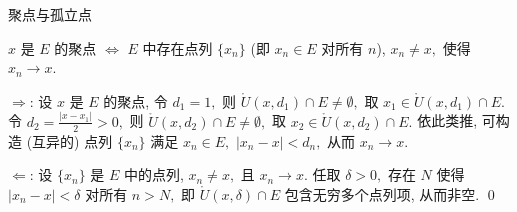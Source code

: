\begin{frame}{聚点与孤立点}

\begin{prop}
$x$ 是 $E$ 的聚点 $\iff$ $E$ 中存在点列 $\{x_n\}$ (即 $x_n \in E$ 对所有 $n$), $x_n \neq x,$ 使得 $x_n \to x.$
\end{prop}

\pause
\vspace{1em}

\startproof[bg=yellow, fg=red]

\vspace{0.5em}

$\Longrightarrow$: 设 $x$ 是 $E$ 的聚点, 令 $d_1 = 1,$  则 $\mathring{U}(x, d_1) \cap E \neq \emptyset,$ 取 $x_1 \in \mathring{U}(x, d_1) \cap E.$ 令 $d_2 = \frac{|x - x_1|}{2} > 0,$ 则 $\mathring{U}(x, d_2) \cap E \neq \emptyset,$ 取 $x_2 \in \mathring{U}(x, d_2) \cap E.$ 依此类推, 可构造 (互异的) 点列 $\{x_n\}$ 满足 $x_n \in E,$ $|x_n - x| < d_n,$ 从而 $x_n \to x.$

\pause
\vspace{0.5em}

$\Longleftarrow$: 设 $\{x_n\}$ 是 $E$ 中的点列, $x_n \neq x,$ 且 $x_n \to x.$ 任取 $\delta > 0,$ 存在 $N$ 使得 $|x_n - x| < \delta$ 对所有 $n > N,$ 即 $\mathring{U}(x, \delta) \cap E$ 包含无穷多个点列项, 从而非空.
\qed

\end{frame}


